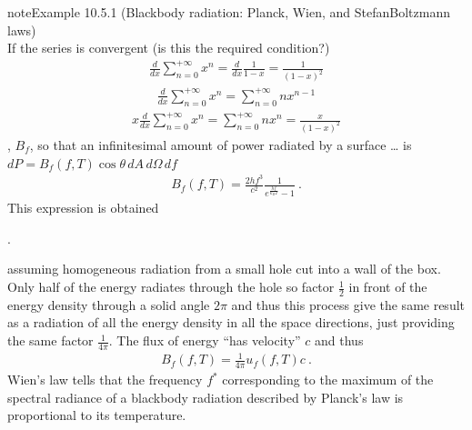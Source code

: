 \documentclass[letterpaper,10pt,english]{jupyterBook}
\begin{document}
\begin{sphinxadmonition}{note}{Example 10.5.1 (Black\sphinxhyphen{}body radiation: Planck, Wien, and Stefan\sphinxhyphen{}Boltzmann laws)}
\begin{equation*}
\end{equation*}
\sphinxAtStartPar
{} If the series is convergent (is this the required condition?)
\begin{equation*}
\begin{split}\frac{d}{d x} \sum_{n=0}^{+\infty} x^n = \frac{d}{dx} \frac{1}{1 - x} = \frac{1}{(1-x)^2}\end{split}
\end{equation*}\begin{equation*}
\begin{split}\frac{d}{d x} \sum_{n=0}^{+\infty} x^n = \sum_{n=0}^{+\infty} n x^{n-1}\end{split}
\end{equation*}\begin{equation*}
\begin{split}x \frac{d}{d x} \sum_{n=0}^{+\infty} x^n = \sum_{n=0}^{+\infty} n x^n = \frac{x}{(1-x)^2}\end{split}
\end{equation*}
\sphinxAtStartPar
{}, \(B_{f}\), so that an infinitesimal amount of power radiated by a surface … is \(d P = B_f(f,T) \cos \theta \, dA \, d\Omega \, d f\)
\begin{equation*}
\begin{split}B_{f}(f, T) = \frac{2 h f^3}{c^2}\frac{1}{e^{\frac{hf}{k_B T}} - 1} \ .\end{split}
\end{equation*}
\sphinxAtStartPar
This expression is obtained%
\begin{footnote}[1]\sphinxAtStartFootnote
{}.
%
\end{footnote} assuming homogeneous radiation from a small hole cut into a wall of the box. Only half of the energy radiates through the hole \sphinxhyphen{} so factor \(\frac{1}{2}\) in front of the energy density \sphinxhyphen{} through a solid angle \(2 \pi\) \sphinxhyphen{} and thus this process give the same result as a radiation of all the energy density in all the space directions, just providing the same factor \(\frac{1}{4 \pi}\). The flux of energy “has velocity” \(c\) and thus
\begin{equation*}
\begin{split}B_{f}(f, T) = \frac{1}{4 \pi} u_{f}(f,T) c \ .\end{split}
\end{equation*}
\sphinxAtStartPar
{} Wien’s law tells that the frequency \(f^*\) corresponding to the maximum of the spectral radiance of a black\sphinxhyphen{}body radiation described by Planck’s law is proportional to its temperature.


\end{sphinxadmonition}
\end{document}

